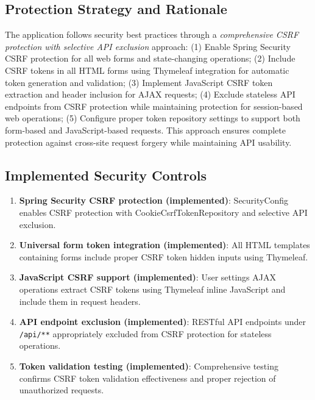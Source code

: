 \documentclass[]{UCD_CS_FYP_Report}
\begin{document}
\subsection{Protection Strategy and Rationale}
The application follows security best practices through a \textit{comprehensive CSRF protection with selective API exclusion} approach: (1) Enable Spring Security CSRF protection for all web forms and state-changing operations; (2) Include CSRF tokens in all HTML forms using Thymeleaf integration for automatic token generation and validation; (3) Implement JavaScript CSRF token extraction and header inclusion for AJAX requests; (4) Exclude stateless API endpoints from CSRF protection while maintaining protection for session-based web operations; (5) Configure proper token repository settings to support both form-based and JavaScript-based requests. This approach ensures complete protection against cross-site request forgery while maintaining API usability.

\subsection{Implemented Security Controls}
\begin{enumerate}
	\item \textbf{Spring Security CSRF protection (implemented)}: SecurityConfig enables CSRF protection with CookieCsrfTokenRepository and selective API exclusion.
	\item \textbf{Universal form token integration (implemented)}: All HTML templates containing forms include proper CSRF token hidden inputs using Thymeleaf.
	\item \textbf{JavaScript CSRF support (implemented)}: User settings AJAX operations extract CSRF tokens using Thymeleaf inline JavaScript and include them in request headers.
	\item \textbf{API endpoint exclusion (implemented)}: RESTful API endpoints under \texttt{/api/**} appropriately excluded from CSRF protection for stateless operations.
	\item \textbf{Token validation testing (implemented)}: Comprehensive testing confirms CSRF token validation effectiveness and proper rejection of unauthorized requests.
\end{enumerate}
\end{document}
